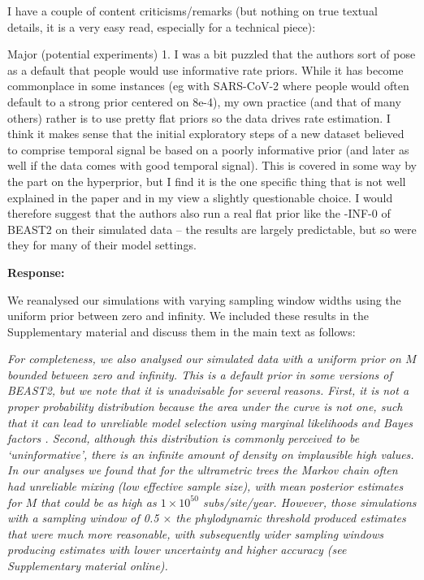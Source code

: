 \documentclass[11pt]{article}
\begin{document}
I have a couple of content criticisms/remarks (but nothing on true textual details, it is a very easy read, especially for a technical piece):

Major (potential experiments)
1. I was a bit puzzled that the authors sort of pose as a default that people would use informative rate priors. While it has become commonplace in some instances (eg with SARS-CoV-2 where people would often default to a strong prior centered on 8e-4), my own practice (and that of many others) rather is to use pretty flat priors so the data drives rate estimation. I think it makes sense that the initial exploratory steps of a new dataset believed to comprise temporal signal be based on a poorly informative prior (and later as well if the data comes with good temporal signal). This is covered in some way by the part on the hyperprior, but I find it is the one specific thing that is not well explained in the paper and in my view a slightly questionable choice. I would therefore suggest that the authors also run a real flat prior like the -INF-0 of BEAST2 on their simulated data – the results are largely predictable, but so were they for many of their model settings.

{\color{blue}\textbf{Response:}

We reanalysed our simulations with varying sampling window widths using the uniform prior between zero and infinity. We included these results in the Supplementary material and discuss them in the main text as follows:

\textit{For completeness, we also analysed our simulated data with a uniform prior on $M$ bounded between zero and infinity. This is a default prior in some versions of BEAST2, but we note that it is unadvisable for several reasons. First, it is not a proper probability distribution because the area under the curve is not one, such that it can lead to unreliable model selection using marginal likelihoods and Bayes factors \citep{r2019marginal, fourment202019}. Second, although this distribution is commonly perceived to be `uninformative', there is an infinite amount of density on implausible high values. In our analyses we found that for the ultrametric trees the Markov chain often had unreliable mixing (low effective sample size), with mean posterior estimates for $M$ that could be as high as $1\times10^{50}$ subs/site/year. However, those simulations with a sampling window of 0.5 $\times$ the phylodynamic threshold produced estimates that were much more reasonable, with subsequently wider sampling windows producing estimates with lower uncertainty and higher accuracy (see Supplementary material online).}
}
\end{document}
